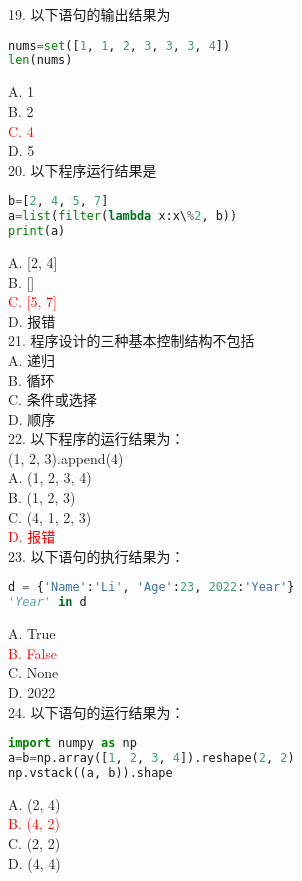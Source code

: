 \documentclass[6pt]{article}
\begin{document}
19. 以下语句的输出结果为\\
\begin{lstlisting}[language=Python]
nums=set([1, 1, 2, 3, 3, 3, 4])
len(nums)
\end{lstlisting}
A. 1  \\
B. 2\\
\textcolor{red}{C. 4}\\
D. 5\\

20. 以下程序运行结果是\\

\begin{lstlisting}[language=Python]
b=[2, 4, 5, 7]
a=list(filter(lambda x:x\%2, b))
print(a)
\end{lstlisting}
A. [2, 4]\\
B. []\\
	\textcolor{red}{C. [5, 7]}\\
D. 报错\\

21. 程序设计的三种基本控制结构不包括\\

A. 递归\\
B. 循环\\
C. 条件或选择\\
D. 顺序\\

22. 以下程序的运行结果为：\\

(1, 2, 3).append(4)\\
A. (1, 2, 3, 4)\\
B. (1, 2, 3)\\
C. (4, 1, 2, 3)\\
	\textcolor{red}{D. 报错}\\

23. 以下语句的执行结果为：\\
\begin{lstlisting}[language=Python]
d = {'Name':'Li', 'Age':23, 2022:'Year'}
'Year' in d
\end{lstlisting}
A. True\\
\textcolor{red}{B. False}\\
C. None\\
D. 2022\\

24. 以下语句的运行结果为：\\

\begin{lstlisting}[language=Python]
import numpy as np
a=b=np.array([1, 2, 3, 4]).reshape(2, 2)
np.vstack((a, b)).shape
\end{lstlisting}
A. (2, 4)\\
\textcolor{red}{B. (4, 2)}\\
C. (2, 2)\\
D. (4, 4)\\
\end{document}
